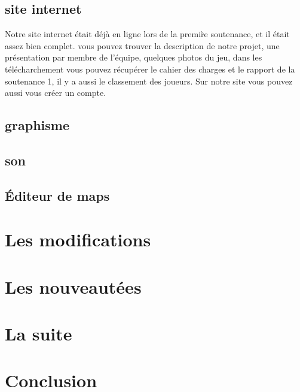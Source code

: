 \documentclass [11pt]{report}
\begin{document}
	\section{site internet}
		Notre site internet \'etait d\'ej\`a en ligne lors de la premi\`re soutenance, et il \'etait assez bien complet. vous pouvez trouver la description de notre projet, une pr\'esentation par membre de l'\'equipe, quelques photos du jeu, dans les t\'el\'echarchement vous pouvez r\'ecup\'erer le cahier des charges et le rapport de la soutenance 1, il y a aussi le classement des joueurs. Sur notre site vous pouvez aussi vous cr\'eer un compte.
	\section{graphisme}
	\section{son}
	\section{\'Editeur de maps}
		
	
\chapter{Les modifications}
\chapter{Les nouveaut\'ees}
\chapter{La suite}
\chapter*{Conclusion}
\end{document}
